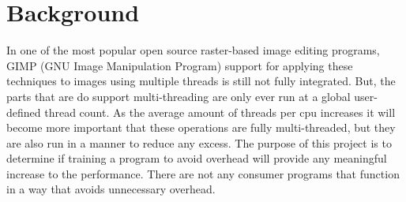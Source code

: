 \documentclass{article}
\begin{document}
    \section{Background}
        In one of the most popular open source raster-based image editing programs, GIMP (GNU Image Manipulation Program) support for applying these techniques to images using multiple threads is still not fully integrated.  But, the parts that are do support multi-threading are only ever run at a global user-defined thread count.  As the average amount of threads per cpu increases it will become more important that these operations are fully multi-threaded, but they are also run in a manner to reduce any excess.  The purpose of this project is to determine if training a program to avoid overhead will provide any meaningful increase to the performance.  There are not any consumer programs that function in a way that avoids unnecessary overhead.
        \pagebreak
    
\end{document}
